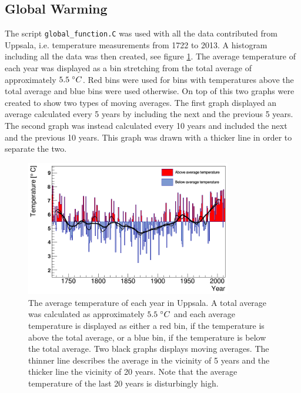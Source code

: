 \documentclass[a4paper]{article}
\begin{document}
\subsection{Global Warming}

The script \texttt{global\_function.C} was used with all the data contributed from Uppsala, i.e. temperature measurements from 1722 to 2013. A histogram including all the data was then created, see figure \ref{global_warming_figure}. The average temperature of each year was displayed as a bin stretching from the total average of approximately $ 5.5 \hspace{1mm} ^\circ C$. Red bins were used for bins with temperatures above the total average and blue bins were used otherwise. On top of this two graphs were created to show two types of moving averages. The first graph displayed an average calculated every 5 years by including the next and the previous 5 years. The second graph was instead calculated every 10 years and included the next and the previous 10 years. This graph was drawn with a thicker line in order to separate the two.

\begin{figure}[H]
\centering
\includegraphics[width=0.8\textwidth]{global_warming.png}
\caption{\label{global_warming_figure} The average temperature of each year in Uppsala. A total average was calculated as approximately $5.5 \hspace{1mm} ^\circ C$ and each average temperature is displayed as either a red bin, if the temperature is above the total average, or a blue bin, if the temperature is below the total average. Two black graphs displays moving averages. The thinner line describes the average in the vicinity of 5 years and the thicker line the vicinity of 20 years. Note that the average temperature of the last 20 years is disturbingly high. }
\end{figure}
\end{document}

